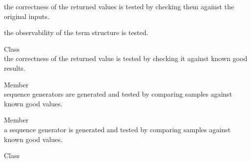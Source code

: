 \begin{DoxyRefList}
\begin{DoxyItemize}
\item the correctness of the returned values is tested by checking them against the original inputs.
\item the observability of the term structure is tested. 
\end{DoxyItemize}
\item[Class \doxylink{class_quant_lib_1_1_poisson_distribution}{Quant\+Lib\+::Poisson\+Distribution} ]\hfill \\
\label{test__test000036}%
%
the correctness of the returned value is tested by checking it against known good results.  
\item[Member \doxylink{namespace_quant_lib_a6dfe9a28285aa1a5dc46060795bf1e57}{Quant\+Lib\+::Poisson\+Pseudo\+Random} ]\hfill \\
\label{test__test000062}%
%
sequence generators are generated and tested by comparing samples against known good values.  
\item[Member \doxylink{namespace_quant_lib_a68b9aaf5f0c17983506b1a1db8575ab0}{Quant\+Lib\+::Pseudo\+Random} ]\hfill \\
\label{test__test000061}%
%
a sequence generator is generated and tested by comparing samples against known good values.  
\item[Class \doxylink{class_quant_lib_1_1_quanto_engine}{Quant\+Lib\+::Quanto\+Engine\texorpdfstring{$<$}{<} Instr, Engine \texorpdfstring{$>$}{>}} ]\hfill \\
\label{test__test000133}%
%


\end{DoxyRefList}
